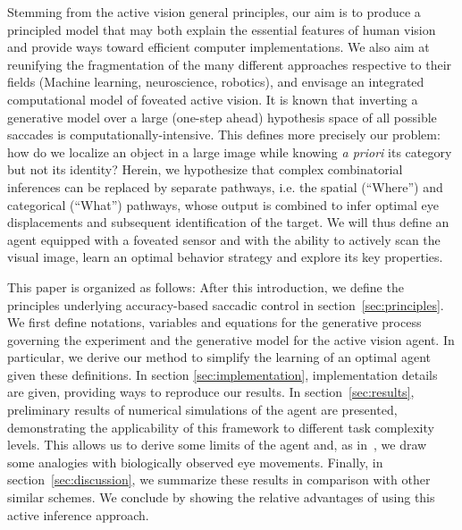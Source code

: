 Stemming from the active vision general principles, our aim is to produce a principled model that may both explain the essential features of human vision and provide ways toward efficient computer implementations. We also aim at reunifying the fragmentation of the many different approaches respective to their fields (Machine learning, neuroscience, robotics), and envisage an integrated computational model of foveated active vision. It is known that inverting a generative model over a large (one-step ahead) hypothesis space of all possible saccades is computationally-intensive. %
This defines more precisely our problem: how do we localize an object in a large image while knowing \emph{a priori} its category but not its identity? 
Herein, we hypothesize that complex combinatorial inferences can be replaced by separate pathways, i.e. the spatial (``Where'') and categorical (``What'') pathways, whose output is combined to infer optimal eye displacements and subsequent identification of the target. 
We will thus define an agent equipped with a foveated sensor and with the ability to actively scan the visual image, %
learn an optimal behavior strategy and explore its key properties.

This paper is organized as follows: After this introduction, we define the principles underlying accuracy-based saccadic control in section~\ref{sec:principles}. We first define notations, variables and equations for the generative process governing the experiment and the generative model for the active vision agent. In particular, we derive our method to simplify the learning of an optimal agent given these definitions. In section \ref{sec:implementation}, implementation details are given, providing ways to reproduce our results. In section~\ref{sec:results}, preliminary results of numerical simulations of the agent are presented, demonstrating the applicability of this framework to different task complexity levels. This allows us to derive some limits of the agent and, as in~\citep{Najemnik05}, we draw some analogies with biologically observed eye movements. Finally, in section~\ref{sec:discussion}, we summarize these results in comparison with other similar schemes. We conclude by showing the relative advantages of using this active inference approach.
